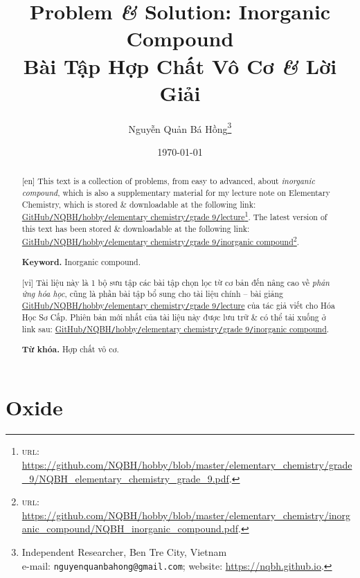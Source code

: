 \documentclass{article}
\title{Problem {\it\&} Solution: Inorganic Compound\\Bài Tập Hợp Chất Vô Cơ {\it\&} Lời Giải}
\author{Nguyễn Quản Bá Hồng\footnote{Independent Researcher, Ben Tre City, Vietnam\\e-mail: \texttt{nguyenquanbahong@gmail.com}; website: \url{https://nqbh.github.io}.}}
\date{\today}
\begin{document}
\maketitle
\begin{abstract}
	\textsf{[en]} This text is a collection of problems, from easy to advanced, about \textit{inorganic compound}, which is also a supplementary material for my lecture note on Elementary Chemistry, which is stored \& downloadable at the following link: \href{https://github.com/NQBH/hobby/blob/master/elementary_chemistry/grade_9/NQBH_elementary_chemistry_grade_9.pdf}{GitHub\texttt{/}NQBH\texttt{/}hobby\texttt{/}elementary chemistry\texttt{/}grade 9\texttt{/}lecture}\footnote{\textsc{url}: \url{https://github.com/NQBH/hobby/blob/master/elementary_chemistry/grade_9/NQBH_elementary_chemistry_grade_9.pdf}.}. The latest version of this text has been stored \& downloadable at the following link: \href{https://github.com/NQBH/hobby/blob/master/elementary_chemistry/inorganic_compound/NQBH_inorganic_compound.pdf}{GitHub\texttt{/}NQBH\texttt{/}hobby\texttt{/}elementary chemistry\texttt{/}grade 9\texttt{/}inorganic compound}\footnote{\textsc{url}: \url{https://github.com/NQBH/hobby/blob/master/elementary_chemistry/inorganic_compound/NQBH_inorganic_compound.pdf}.}.
	
	\textsf{\textbf{Keyword.} Inorganic compound.}
	\vspace{2mm}
	
	\textsf{[vi]} Tài liệu này là 1 bộ sưu tập các bài tập chọn lọc từ cơ bản đến nâng cao về \textit{phản ứng hóa học}, cũng là phần bài tập bổ sung cho tài liệu chính -- bài giảng \href{https://github.com/NQBH/hobby/blob/master/elementary_chemistry/grade_9/NQBH_elementary_chemistry_grade_9.pdf}{GitHub\texttt{/}NQBH\texttt{/}hobby\texttt{/}elementary chemistry\texttt{/}grade 9\texttt{/}lecture} của tác giả viết cho Hóa Học Sơ Cấp. Phiên bản mới nhất của tài liệu này được lưu trữ \& có thể tải xuống ở link sau: \href{https://github.com/NQBH/hobby/blob/master/elementary_chemistry/grade_9/real/NQBH_real.pdf}{GitHub\texttt{/}NQBH\texttt{/}hobby\texttt{/}elementary chemistry\texttt{/}grade 9\texttt{/}inorganic compound}.
	
	\textsf{\textbf{Từ khóa.} Hợp chất vô cơ.}
\end{abstract}
\setcounter{secnumdepth}{4}
\setcounter{tocdepth}{3}
\tableofcontents
\newpage


\section{Oxide}
\end{document}
